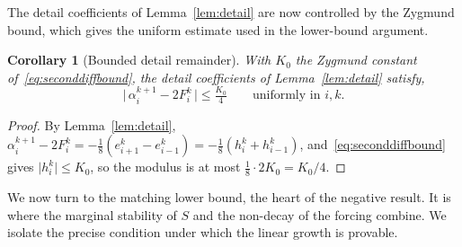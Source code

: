 \documentclass{article}
\theoremstyle{plain}
\newtheorem{corollary}[theorem]{Corollary}
\theoremstyle{definition}
\newcommand{\abs}[1]{\lvert #1 \rvert}
\begin{document}
The detail coefficients of Lemma~\ref{lem:detail} are now controlled by the
Zygmund bound, which gives the uniform estimate used in the lower-bound argument.

\begin{corollary}[Bounded detail remainder]\label{cor:detailbound}
With $K_0$ the Zygmund constant of~\eqref{eq:seconddiffbound}, the detail
coefficients of Lemma~\ref{lem:detail} satisfy,
\begin{equation}\label{eq:detailbound}
  \bigl\lvert\,\alpha_i^{k+1}-2F_i^{k}\,\bigr\rvert\le \tfrac{K_0}{4}
  \qquad\text{uniformly in }i,k.
\end{equation}
\end{corollary}

\begin{proof}
By Lemma~\ref{lem:detail}, $\alpha_i^{k+1}-2F_i^k=-\tfrac18(e_{i+1}^k-e_{i-1}^k)
=-\tfrac18(h_i^k+h_{i-1}^k)$, and~\eqref{eq:seconddiffbound} gives
$\abs{h_i^k}\le K_0$, so the modulus is at most $\tfrac18\cdot 2K_0=K_0/4$.
\end{proof}

We now turn to the matching lower bound, the heart of the negative result. It is
where the marginal stability of $S$ and the non-decay of the forcing combine. We
isolate the precise condition under which the linear growth is provable.
\end{document}
